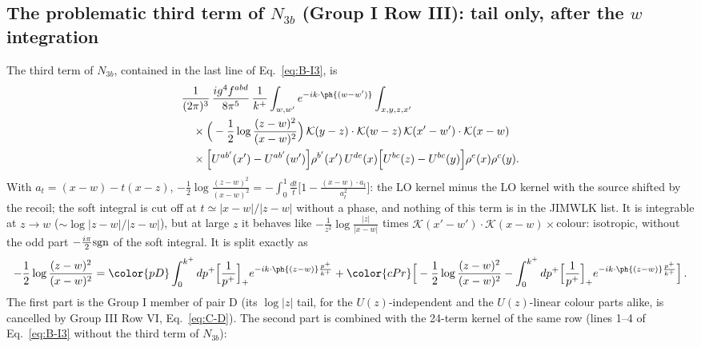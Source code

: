 \subsection{The problematic third term of $N_{3b}$ (Group I Row III): tail only, after the $w$ integration}\label{sec:C4}
The third term of $N_{3b}$, contained in the last line of Eq.~\eqref{eq:B-I3}, is
\begin{align}
&\frac{1}{(2\pi)^{3}}\,\frac{ig^{4}f^{abd}}{8\pi^{5}}\,\frac{1}{k^{+}}\int_{w,w'}e^{-ik\cdot\ph{(w-w')}}\int_{x,y,z,x'}\notag\\
&\quad\times\Big(-\frac12\log\frac{(z-w)^{2}}{(x-w)^{2}}\Big)\,\mathcal{K}(y-z)\cdot\mathcal{K}(w-z)\,\mathcal{K}(x'-w')\cdot\mathcal{K}(x-w)\notag\\
&\quad\times\Big[U^{ab'}(x')-U^{ab'}(w')\Big]\rho^{b'}(x')\,U^{de}(x)\Big[U^{bc}(z)-U^{bc}(y)\Big]\rho^{e}(x)\rho^{c}(y).\notag
\end{align}
With $a_{t}=(x-w)-t(x-z)$, $-\frac12\log\frac{(z-w)^{2}}{(x-w)^{2}}=-\int_{0}^{1}\frac{dt}{t}\big[1-\frac{(x-w)\cdot a_{t}}{a_{t}^{2}}\big]$: the LO kernel minus the LO kernel with the source shifted by the recoil; the soft integral is cut off at $t\simeq|x-w|/|z-w|$ without a phase, and nothing of this term is in the JIMWLK list. It is integrable at $z\to w$ ($\sim\log|z-w|/|z-w|$), but at large $z$ it behaves like $-\frac{1}{z^{2}}\log\frac{|z|}{|x-w|}$ times $\mathcal{K}(x'-w')\cdot\mathcal{K}(x-w)\times$colour: isotropic, without the odd part $-\frac{i\pi}{2}{\rm sgn}$ of the soft integral. It is split exactly as
\begin{align}
-\frac12\log\frac{(z-w)^{2}}{(x-w)^{2}}={\color{pD}\int_{0}^{k^{+}}dp^{+}\Big[\frac{1}{p^{+}}\Big]_{+}e^{-ik\cdot\ph{(z-w)}\frac{p^{+}}{k^{+}}}}+{\color{cPr}\Big[-\frac12\log\frac{(z-w)^{2}}{(x-w)^{2}}-\int_{0}^{k^{+}}dp^{+}\Big[\frac{1}{p^{+}}\Big]_{+}e^{-ik\cdot\ph{(z-w)}\frac{p^{+}}{k^{+}}}\Big]}\,.\notag
\end{align}
{\color{pD}The first part is the Group I member of pair D} (its $\log|z|$ tail, for the $U(z)$-independent and the $U(z)$-linear colour parts alike, is cancelled by Group III Row VI, Eq.~\eqref{eq:C-D}). {\color{cPr}The second part is combined with the 24-term kernel of the same row (lines 1--4 of Eq.~\eqref{eq:B-I3} without the third term of $N_{3b}$):}
\begingroup\color{cPr}
